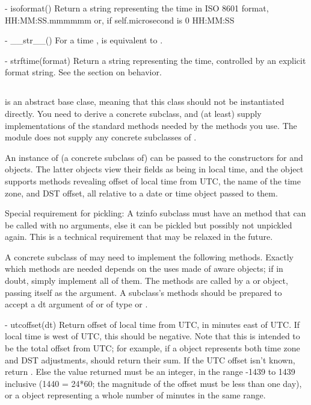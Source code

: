   - isoformat()
    Return a string representing the time in ISO 8601 format,
        HH:MM:SS.mmmmmm
    or, if self.microsecond is 0
        HH:MM:SS

  - __str__()
    For a time ,  is equivalent to
    .

  - strftime(format)
    Return a string representing the time, controlled by an explicit
    format string.  See the section on  behavior.


\subsection{ \label{datetime-tzinfo}}

 is an abstract base clase, meaning that this class
should not be instantiated directly.  You need to derive a concrete
subclass, and (at least) supply implementations of the standard
 methods needed by the  methods you
use. The  module does not supply any concrete
subclasses of .

An instance of (a concrete subclass of)  can be passed
to the constructors for  and  objects.
The latter objects view their fields as being in local time, and the
 object supports methods revealing offset of local time
from UTC, the name of the time zone, and DST offset, all relative to a
date or time object passed to them.

Special requirement for pickling:  A tzinfo subclass must have an
 method that can be called with no arguments, else it
can be pickled but possibly not unpickled again.  This is a technical
requirement that may be relaxed in the future.

A concrete subclass of  may need to implement the
following methods.  Exactly which methods are needed depends on the
uses made of aware  objects; if in doubt, simply
implement all of them.  The methods are called by a 
or  object, passing itself as the argument.  A
 subclass's methods should be prepared to accept a dt
argument of  or of type  or
.

  - utcoffset(dt)
    Return offset of local time from UTC, in minutes east of UTC.  If
    local time is west of UTC, this should be negative.  Note that this
    is intended to be the total offset from UTC; for example, if a
     object represents both time zone and DST adjustments,
     should return their sum.  If the UTC offset
    isn't known, return .  Else the value returned must be
    an integer, in the range -1439 to 1439 inclusive (1440 = 24*60;
    the magnitude of the offset must be less than one day), or a
     object representing a whole number of minutes
    in the same range.

